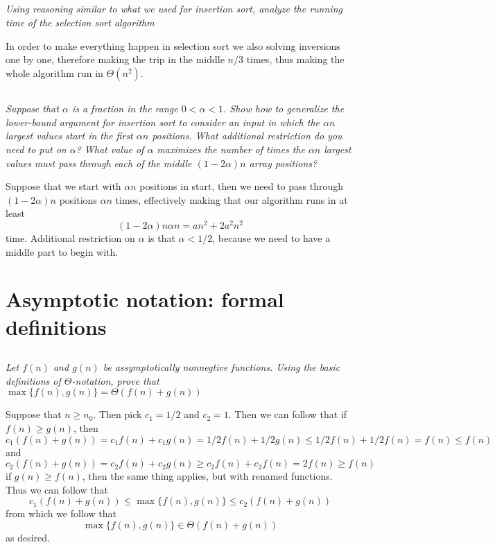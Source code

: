 \documentclass[11pt,oneside,titlepage]{book}
\begin{document}
\subsection{}

\textit{Using reasoning similar to what we used for insertion sort, analyze the running time of
  the selection sort algorithm}

In order to make everything happen in selection sort we also solving inversions one by one,
therefore making the trip in the middle $n/3$ times, thus making the whole algorithm
run in $\Theta(n^2)$.

\subsection{}

\textit{Suppose that $\alpha$ is a fraction in the range $0 < \alpha < 1$. Show how to
  generalize the lower-bound argument for insertion sort to consider an input in which the
  $\alpha n$ largest values start in the first $\alpha n$ positions. What additional restriction
  do you need to put on $\alpha$? What value of $\alpha$ maximizes the number of times the
  $\alpha n$ largest values must pass through each of the middle $(1 - 2\alpha)n$ array positions?}

Suppose that we start with $\alpha n$ positions in start, then we need to pass through
$(1 - 2\alpha)n$ positions $\alpha n$ times, effectively making that our algorithm runs in
at least
$$(1 - 2\alpha)n \alpha n = an^2 + 2 a^2 n^2$$
time. Additional restriction on $\alpha$ is that $\alpha < 1/2$, because we need to have a middle
part to begin with.

\section{Asymptotic notation: formal definitions}

\subsection{}

\textit{Let $f(n)$ and $g(n)$ be assymptotically nonnegtive functions. Using the basic
  definitions of $\Theta$-notation, prove that $\max\{f(n), g(n)\} = \Theta(f(n) + g(n))$}

Suppose that $n \geq n_0$. Then pick $c_1 = 1/2$ and $c_2 = 1$. Then we can follow that
if $f(n) \geq g(n)$, then
$$c_1(f(n) + g(n)) = c_1 f(n) + c_1 g(n) = 1/2 f(n) + 1/2 g(n) \leq 1/2 f(n) + 1/2 f(n) =
f(n) \leq f(n)$$
and
$$c_2(f(n) + g(n)) = c_2 f(n) + c_2g(n) \geq c_2 f(n) + c_2f(n) = 2f(n) \geq f(n)$$
if $g(n) \geq f(n)$, then the same thing applies, but with renamed functions.
Thus we can follow that 
$$ c_1(f(n) + g(n)) \leq \max \{f(n), g(n)\} \leq c_2(f(n) + g(n))$$
from which we follow that
$$\max \{f(n), g(n)\} \in \Theta(f(n) + g(n))$$
as desired.
\end{document}

